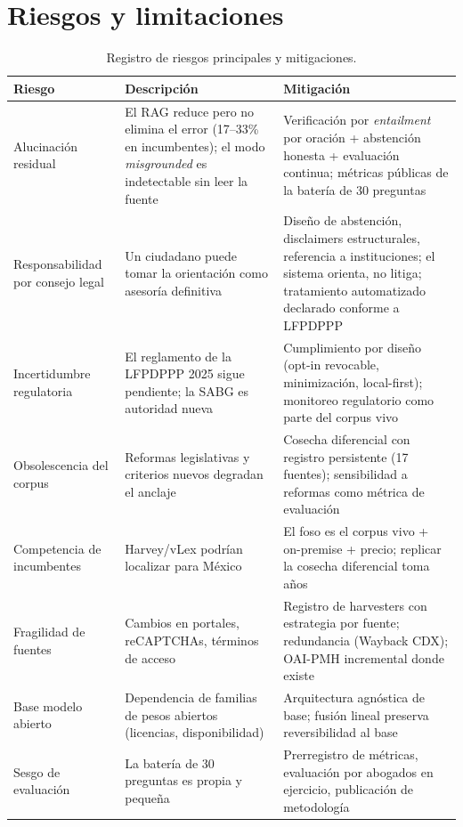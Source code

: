 \section{Riesgos y limitaciones}\label{sec:riesgos}

\begin{table}[H]
\centering\small
\caption{Registro de riesgos principales y mitigaciones.}
\label{tab:riesgos}
\begin{tabular}{@{}p{3.4cm}p{4.9cm}p{5.6cm}@{}}
\toprule
\textbf{Riesgo} & \textbf{Descripción} & \textbf{Mitigación} \\
\midrule
Alucinación residual & El RAG reduce pero no elimina el error (17--33\% en incumbentes\cite{magesh2025}); el modo \emph{misgrounded} es indetectable sin leer la fuente & Verificación por \emph{entailment} por oración + abstención honesta + evaluación continua; métricas públicas de la batería de 30 preguntas \\
Responsabilidad por consejo legal & Un ciudadano puede tomar la orientación como asesoría definitiva & Diseño de abstención, disclaimers estructurales, referencia a instituciones; el sistema orienta, no litiga; tratamiento automatizado declarado conforme a LFPDPPP\cite{cosio2026} \\
Incertidumbre regulatoria & El reglamento de la LFPDPPP 2025 sigue pendiente; la SABG es autoridad nueva\cite{cosio2026,kyc2026} & Cumplimiento por diseño (opt-in revocable, minimización, local-first); monitoreo regulatorio como parte del corpus vivo \\
Obsolescencia del corpus & Reformas legislativas y criterios nuevos degradan el anclaje & Cosecha diferencial con registro persistente (17 fuentes); sensibilidad a reformas como métrica de evaluación \\
Competencia de incumbentes & Harvey/vLex podrían localizar para México\cite{harvey2026,vlex2024} & El foso es el corpus vivo + on-premise + precio; replicar la cosecha diferencial toma años \\
Fragilidad de fuentes & Cambios en portales, reCAPTCHAs, términos de acceso & Registro de harvesters con estrategia por fuente; redundancia (Wayback CDX); OAI-PMH incremental donde existe \\
Base modelo abierto & Dependencia de familias de pesos abiertos (licencias, disponibilidad) & Arquitectura agnóstica de base; fusión lineal preserva reversibilidad al base \\
Sesgo de evaluación & La batería de 30 preguntas es propia y pequeña & Prerregistro de métricas, evaluación por abogados en ejercicio, publicación de metodología \\
\bottomrule
\end{tabular}
\end{table}

